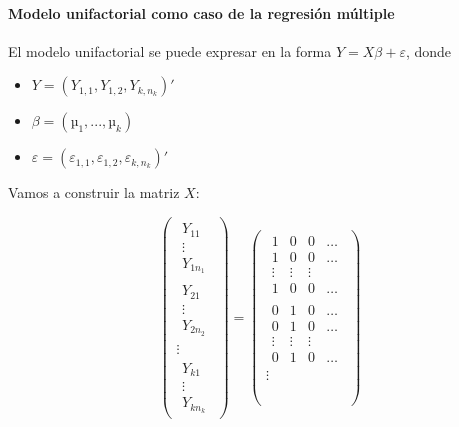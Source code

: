 \paragraph{Modelo unifactorial como caso de la regresión múltiple}

El modelo unifactorial se puede expresar en la forma $Y = Xβ + ε$,
donde

\begin{itemize}
	\item $Y=(Y_{1,1},Y_{1,2},Y_{k,n_k})'$
	\item $β = (µ_1,...,µ_k)$
	\item $ε=(ε_{1,1},ε_{1,2},ε_{k,n_k})'$
\end{itemize}

Vamos a construir la matriz $X$:

\[
\begin{pmatrix}
\begin{matrix} Y_{11}\\\vdots \\Y_{1n_1}\end{matrix}\\\hline
\begin{matrix} Y_{21}\\\vdots \\Y_{2n_2}\end{matrix}\\\hline
\vdots\\\hline
\begin{matrix} Y_{k1}\\\vdots \\Y_{kn_k}\end{matrix}
\end{pmatrix}
 = 
\begin{pmatrix}
	\begin{matrix}
		1&0&0&\dots\\
		1&0&0&\dots\\
		\vdots&\vdots&\vdots&\\
		1&0&0&\dots
	\end{matrix}\\\hline
	\begin{matrix}
		0&1&0&\dots\\
		0&1&0&\dots\\
		\vdots&\vdots&\vdots&\\
		0&1&0&\dots
	\end{matrix}\\\hline 
	\vdots \\\hline
	\begin{matrix}

\end{matrix}
\end{pmatrix}\]
